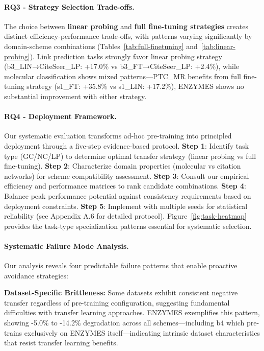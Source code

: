 \documentclass[11pt]{article}
\begin{document}
\paragraph{RQ3 - Strategy Selection Trade-offs.} The choice between \textbf{linear probing} and \textbf{full fine-tuning strategies} creates distinct efficiency-performance trade-offs, with patterns varying significantly by domain-scheme combinations (Tables~\ref{tab:full-finetuning} and~\ref{tab:linear-probing}). Link prediction tasks strongly favor linear probing strategy (b3\_LIN→CiteSeer\_LP: +17.0\% vs b3\_FT→CiteSeer\_LP: +2.4\%), while molecular classification shows mixed patterns—PTC\_MR benefits from full fine-tuning strategy (s1\_FT: +35.8\% vs s1\_LIN: +17.2\%), ENZYMES shows no substantial improvement with either strategy.

\paragraph{RQ4 - Deployment Framework.} Our systematic evaluation transforms ad-hoc pre-training into principled deployment through a five-step evidence-based protocol. \textbf{Step 1}: Identify task type (GC/NC/LP) to determine optimal transfer strategy (linear probing vs full fine-tuning). \textbf{Step 2}: Characterize domain properties (molecular vs citation networks) for scheme compatibility assessment. \textbf{Step 3}: Consult our empirical efficiency and performance matrices to rank candidate combinations. \textbf{Step 4}: Balance peak performance potential against consistency requirements based on deployment constraints. \textbf{Step 5}: Implement with multiple seeds for statistical reliability (see Appendix A.6 for detailed protocol). Figure~\ref{fig:task-heatmap} provides the task-type specialization patterns essential for systematic selection.

\paragraph{Systematic Failure Mode Analysis.} Our analysis reveals four predictable failure patterns that enable proactive avoidance strategies:

\textbf{Dataset-Specific Brittleness:} Some datasets exhibit consistent negative transfer regardless of pre-training configuration, suggesting fundamental difficulties with transfer learning approaches. ENZYMES exemplifies this pattern, showing -5.0\% to -14.2\% degradation across all schemes—including b4 which pre-trains exclusively on ENZYMES itself—indicating intrinsic dataset characteristics that resist transfer learning benefits.
\end{document}
